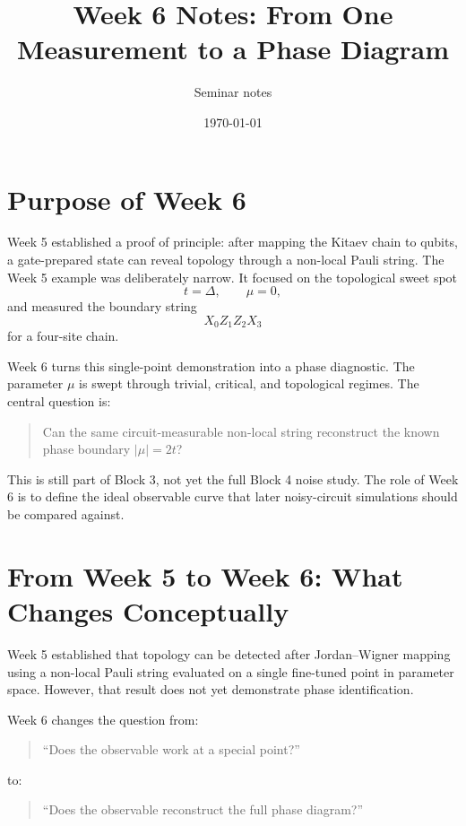 \documentclass[11pt]{article}
\title{Week 6 Notes: From One Measurement to a Phase Diagram}
\author{Seminar notes}
\date{\today}
\begin{document}
\maketitle

\section{Purpose of Week 6}

Week 5 established a proof of principle: after mapping the Kitaev chain to qubits, a gate-prepared state can reveal topology through a non-local Pauli string. The Week 5 example was deliberately narrow. It focused on the topological sweet spot
\begin{equation}
  t=\Delta, \qquad \mu=0,
\end{equation}
and measured the boundary string
\begin{equation}
  X_0 Z_1 Z_2 X_3
\end{equation}
for a four-site chain.

Week 6 turns this single-point demonstration into a phase diagnostic. The parameter $\mu$ is swept through trivial, critical, and topological regimes. The central question is:
\begin{quote}
  Can the same circuit-measurable non-local string reconstruct the known phase boundary $|\mu|=2t$?
\end{quote}

This is still part of Block 3, not yet the full Block 4 noise study. The role of Week 6 is to define the ideal observable curve that later noisy-circuit simulations should be compared against.
\section{From Week 5 to Week 6: What Changes Conceptually}

Week 5 established that topology can be detected after Jordan--Wigner mapping using a non-local Pauli string evaluated on a single fine-tuned point in parameter space. However, that result does not yet demonstrate phase identification.

Week 6 changes the question from:
\begin{quote}
``Does the observable work at a special point?''
\end{quote}
to:
\begin{quote}
``Does the observable reconstruct the full phase diagram?''
\end{quote}
\end{document}
